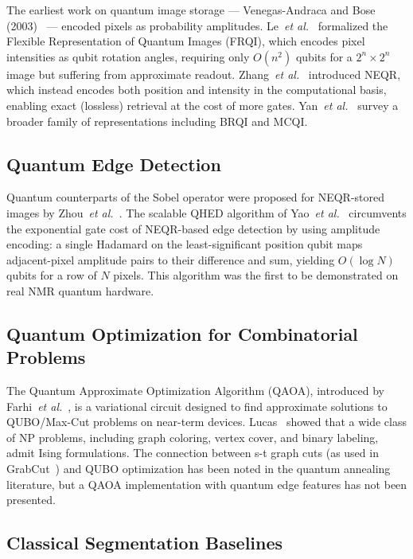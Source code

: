 \documentclass[journal]{IEEEtran}
\begin{document}
The earliest work on quantum image storage — Venegas-Andraca and Bose
(2003)~\cite{venegas2011survey} — encoded pixels as probability amplitudes.
Le~\textit{et al.}~\cite{le2011frqi} formalized the Flexible Representation
of Quantum Images (FRQI), which encodes pixel intensities as qubit rotation
angles, requiring only $O(n^2)$ qubits for a $2^n\times 2^n$ image but
suffering from approximate readout.  Zhang~\textit{et al.}~\cite{zhang2013neqr}
introduced NEQR, which instead encodes both position and intensity in the
computational basis, enabling exact (lossless) retrieval at the cost of more
gates.  Yan~\textit{et al.}~\cite{yan2016brqi} survey a broader family of
representations including BRQI and MCQI.

\subsection{Quantum Edge Detection}

Quantum counterparts of the Sobel operator were proposed for NEQR-stored
images by Zhou~\textit{et al.}~\cite{zhou2017qsobel}.  The scalable QHED
algorithm of Yao~\textit{et al.}~\cite{yao2017qhed} circumvents the
exponential gate cost of NEQR-based edge detection by using amplitude
encoding: a single Hadamard on the least-significant position qubit maps
adjacent-pixel amplitude pairs to their difference and sum, yielding
$O(\log N)$ qubits for a row of $N$ pixels.  This algorithm was the first
to be demonstrated on real NMR quantum hardware.

\subsection{Quantum Optimization for Combinatorial Problems}

The Quantum Approximate Optimization Algorithm (QAOA), introduced by
Farhi~\textit{et al.}~\cite{farhi2014qaoa}, is a variational circuit
designed to find approximate solutions to QUBO/Max-Cut problems on near-term
devices.  Lucas~\cite{lucas2014ising} showed that a wide class of NP
problems, including graph coloring, vertex cover, and binary labeling, admit
Ising formulations.  The connection between s-t graph cuts (as used in
GrabCut~\cite{rother2004grabcut}) and QUBO optimization has been noted in
the quantum annealing literature, but a QAOA implementation with quantum edge
features has not been presented.

\subsection{Classical Segmentation Baselines}
\end{document}
